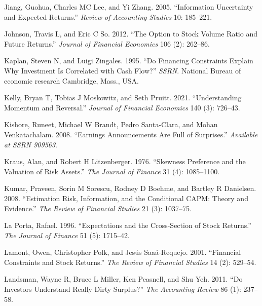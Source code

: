 \documentclass[
  letterpaper,
  DIV=11,
  numbers=noendperiod]{scrreprt}
\newlength{\cslhangindent}
\newlength{\cslentryspacingunit} %
\newenvironment{CSLReferences}[2] %
 {%
  \setlength{\parindent}{0pt}
  \ifodd #1
  \let\oldpar\par
  \def\par{\hangindent=\cslhangindent\oldpar}
  \fi
  \setlength{\parskip}{#2\cslentryspacingunit}
 }%
 {}
\begin{document}
\begin{CSLReferences}{1}{0}
\leavevmode{}%
Jiang, Guohua, Charles MC Lee, and Yi Zhang. 2005. {``Information
Uncertainty and Expected Returns.''} \emph{Review of Accounting Studies}
10: 185--221.

\leavevmode{}%
Johnson, Travis L, and Eric C So. 2012. {``The Option to Stock Volume
Ratio and Future Returns.''} \emph{Journal of Financial Economics} 106
(2): 262--86.

\leavevmode{}%
Kaplan, Steven N, and Luigi Zingales. 1995. {``Do Financing Constraints
Explain Why Investment Is Correlated with Cash Flow?''} \emph{SSRN}.
National Bureau of economic research Cambridge, Mass., USA.

\leavevmode{}%
Kelly, Bryan T, Tobias J Moskowitz, and Seth Pruitt. 2021.
{``Understanding Momentum and Reversal.''} \emph{Journal of Financial
Economics} 140 (3): 726--43.

\leavevmode{}%
Kishore, Runeet, Michael W Brandt, Pedro Santa-Clara, and Mohan
Venkatachalam. 2008. {``Earnings Announcements Are Full of Surprises.''}
\emph{Available at SSRN 909563}.

\leavevmode{}%
Kraus, Alan, and Robert H Litzenberger. 1976. {``Skewness Preference and
the Valuation of Risk Assets.''} \emph{The Journal of Finance} 31 (4):
1085--1100.

\leavevmode{}%
Kumar, Praveen, Sorin M Sorescu, Rodney D Boehme, and Bartley R
Danielsen. 2008. {``Estimation Risk, Information, and the Conditional
CAPM: Theory and Evidence.''} \emph{The Review of Financial Studies} 21
(3): 1037--75.

\leavevmode{}%
La Porta, Rafael. 1996. {``Expectations and the Cross-Section of Stock
Returns.''} \emph{The Journal of Finance} 51 (5): 1715--42.

\leavevmode{}%
Lamont, Owen, Christopher Polk, and Jesús Saaá-Requejo. 2001.
{``Financial Constraints and Stock Returns.''} \emph{The Review of
Financial Studies} 14 (2): 529--54.

\leavevmode{}%
Landsman, Wayne R, Bruce L Miller, Ken Peasnell, and Shu Yeh. 2011.
{``Do Investors Understand Really Dirty Surplus?''} \emph{The Accounting
Review} 86 (1): 237--58.


\end{CSLReferences}
\end{document}
